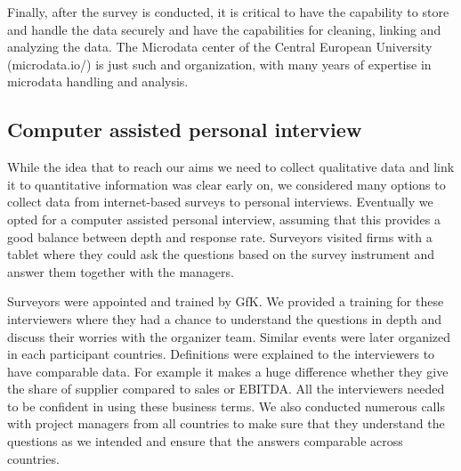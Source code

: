 \documentclass[final, dvipsnames, authoryear,12pt]{elsarticle}
\begin{document}

Finally, after the survey is conducted, it is critical to have the capability to store and handle the data securely and have the capabilities for cleaning, linking and analyzing the data. The Microdata center of the Central European University (microdata.io/) is just such and organization, with many years of expertise in microdata handling and analysis. 


\subsection{Computer assisted personal interview}

While the idea that to reach our aims we need to collect qualitative data and link it to quantitative information was clear early on, we considered many options to collect data from internet-based surveys to personal interviews. Eventually we opted for a computer assisted personal interview, assuming that this provides a good balance between depth and response rate. Surveyors visited firms with a tablet where they could ask the questions based on the survey instrument and answer them together with the managers.


Surveyors were appointed and trained by GfK. We provided a training for these interviewers where they had a chance to understand the questions in depth and discuss their worries with the organizer team. Similar events were later organized in each participant countries. Definitions were explained to the interviewers to have comparable data. For example it makes a huge difference whether they give the share of supplier compared to sales or EBITDA. All the interviewers needed to be confident in using these business terms. We also conducted numerous calls with project managers from all countries to make sure that they understand the questions as we intended and ensure that the answers comparable across countries. 
\end{document}
